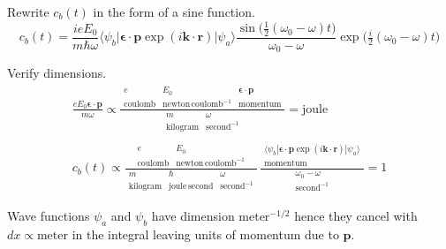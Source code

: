 Rewrite $c_b(t)$ in the form of a sine function.
\begin{equation*}
c_b(t)=\frac{ieE_0}{m\hbar\omega}
\langle\psi_b|\boldsymbol{\epsilon}\cdot\mathbf p\exp(i\mathbf k\cdot\mathbf r)|\psi_a\rangle
\frac{\sin\bigl(\tfrac{1}{2}(\omega_0-\omega)t\bigr)}{\omega_0-\omega}
\exp\bigl(\tfrac{i}{2}(\omega_0-\omega)t\bigr)
\tag{2}
\end{equation*}

Verify dimensions.
\begin{gather*}
\frac{eE_0\boldsymbol{\epsilon}\cdot\mathbf p}{m\omega}
\propto\frac{
\begin{matrix}
e & E_0 & \boldsymbol{\epsilon}\cdot\mathbf p
\\
\text{coulomb}
& \text{newton}\,\text{coulomb}^{-1}
& \text{momentum}
\end{matrix}
}{
\begin{matrix}
m & \omega
\\
\text{kilogram} & \text{second}^{-1}
\end{matrix}
}=\text{joule}
\\ %
c_b(t)\propto\frac{
\begin{matrix}
e & E_0
\\
\text{coulomb} & \text{newton}\,\text{coulomb}^{-1}
\end{matrix}
}{
\begin{matrix}
m & \hbar & \omega
\\
\text{kilogram} & \text{joule}\,\text{second} & \text{second}^{-1}
\end{matrix}
}
\,
\frac{
\begin{matrix}
\\
\langle\psi_b|\boldsymbol{\epsilon}\cdot\mathbf p\exp(i\mathbf k\cdot\mathbf r)|\psi_a\rangle
\\
\text{momentum}
\end{matrix}
}{
\begin{matrix}
\omega_0-\omega
\\
\text{second}^{-1}
\end{matrix}
}
=1
\end{gather*}

Wave functions $\psi_a$ and $\psi_b$ have dimension $\text{meter}^{-1/2}$
hence they cancel with $dx\propto\text{meter}$ in the integral leaving
units of momentum due to $\mathbf p$.


